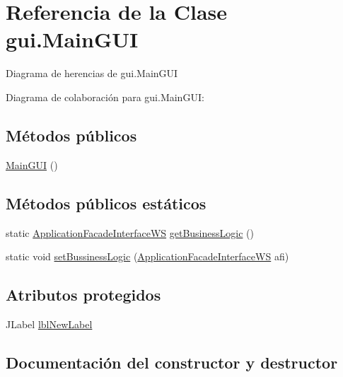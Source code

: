 \hypertarget{classgui_1_1_main_g_u_i}{}\section{Referencia de la Clase gui.\+Main\+G\+UI}
\label{classgui_1_1_main_g_u_i}


Diagrama de herencias de gui.\+Main\+G\+UI


Diagrama de colaboración para gui.\+Main\+G\+UI\+:
\subsection*{Métodos públicos}
\begin{DoxyCompactItemize}
\item 
\mbox{\hyperlink{classgui_1_1_main_g_u_i_a6968ef45452fe10bd544a46d6e099c32}{Main\+G\+UI}} ()
\end{DoxyCompactItemize}
\subsection*{Métodos públicos estáticos}
\begin{DoxyCompactItemize}
\item 
static \mbox{\hyperlink{interfacebusiness_logic_1_1_application_facade_interface_w_s}{Application\+Facade\+Interface\+WS}} \mbox{\hyperlink{classgui_1_1_main_g_u_i_a037b3ca54b0c61d6899721ff55cca365}{get\+Business\+Logic}} ()
\item 
static void \mbox{\hyperlink{classgui_1_1_main_g_u_i_a306310290095fdaa31a668470fd6380d}{set\+Bussiness\+Logic}} (\mbox{\hyperlink{interfacebusiness_logic_1_1_application_facade_interface_w_s}{Application\+Facade\+Interface\+WS}} afi)
\end{DoxyCompactItemize}
\subsection*{Atributos protegidos}
\begin{DoxyCompactItemize}
\item 
J\+Label \mbox{\hyperlink{classgui_1_1_main_g_u_i_a0fc72962f06022026150f3d01638f929}{lbl\+New\+Label}}
\end{DoxyCompactItemize}


\subsection{Documentación del constructor y destructor}
\mbox{\label{classgui_1_1_main_g_u_i_a6968ef45452fe10bd544a46d6e099c32}} 

